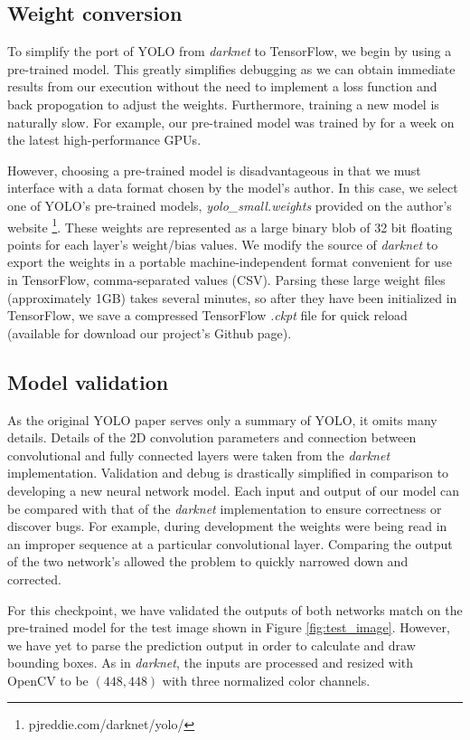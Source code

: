 \documentclass{sig-alternate-05-2015}
\begin{document}
\subsection{Weight conversion}
To simplify the port of YOLO from \textit{darknet} to TensorFlow, we begin by using a pre-trained model. This greatly simplifies debugging as we can obtain immediate results from our execution without the need to implement a loss function and back propogation to adjust the weights. Furthermore, training a new model is naturally slow. For example, our pre-trained model was trained by \cite{redmon:yolo} for a week on the latest high-performance GPUs.

However, choosing a pre-trained model is disadvantageous in that we must interface with a data format chosen by the model's author. In this case, we select one of YOLO's pre-trained models, \textit{yolo\_small.weights} provided on the author's website \footnote{pjreddie.com/darknet/yolo/}. These weights are represented as a large binary blob of 32 bit floating points for each layer's weight/bias values. We modify the source of \textit{darknet} to export the weights in a portable machine-independent format convenient for use in TensorFlow, comma-separated values (CSV). Parsing these large weight files (approximately 1GB) takes several minutes, so after they have been initialized in TensorFlow, we save a compressed TensorFlow \textit{.ckpt} file for quick reload (available for download our project's Github page).

\subsection{Model validation}
As the original YOLO paper serves only a summary of YOLO, it omits many details. Details of the 2D convolution parameters and connection between convolutional and fully connected layers were taken from the \textit{darknet} implementation. Validation and debug is drastically simplified in comparison to developing a new neural network model. Each input and output of our model can be compared with that of the \textit{darknet} implementation to ensure correctness or discover bugs. For example, during development the weights were being read in an improper sequence at a particular convolutional layer. Comparing the output of the two network's allowed the problem to quickly narrowed down and corrected.

For this checkpoint, we have validated the outputs of both networks match on the pre-trained model for the test image shown in Figure \ref{fig:test_image}. However, we have yet to parse the prediction output in order to calculate and draw bounding boxes. As in \textit{darknet}, the inputs are processed and resized with OpenCV to be $(448, 448)$ with three normalized color channels.
\end{document}
